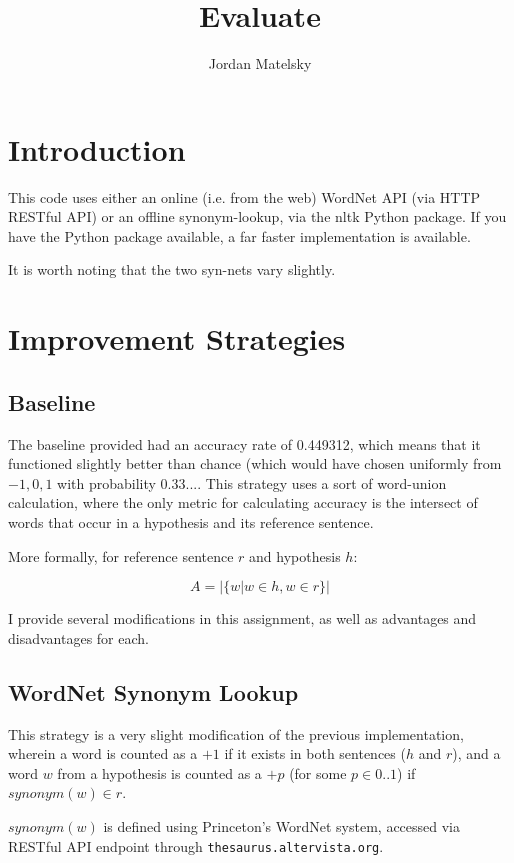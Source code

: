 \documentclass{article}
\title{Evaluate}
\author{Jordan Matelsky}
\begin{document}
\maketitle

\section{Introduction}
This code uses either an online (i.e. from the web) WordNet API (via HTTP RESTful API) or an offline synonym-lookup, via the nltk Python package. If you have the Python package available, a far faster implementation is available.

It is worth noting that the two syn-nets vary slightly.

\section{Improvement Strategies}

\subsection{Baseline}
The baseline provided had an accuracy rate of 0.449312, which means that it functioned slightly better than chance (which would have chosen uniformly from ${-1, 0, 1}$ with probability $0.33...$. This strategy uses a sort of word-union calculation, where the only metric for calculating accuracy is the intersect of words that occur in a hypothesis and its reference sentence.

More formally, for reference sentence $r$ and hypothesis $h$:

$$A = \big| \{ w | w \in h, w \in r \} \big|$$

I provide several modifications in this assignment, as well as advantages and disadvantages for each.

\subsection{WordNet Synonym Lookup}
This strategy is a very slight modification of the previous implementation, wherein a word is counted as a $+1$ if it exists in both sentences ($h$ and $r$), and a word $w$ from a hypothesis is counted as a $+p$ (for some $p \in 0..1$) if $synonym(w) \in r$.

$synonym(w)$ is defined using Princeton's WordNet system, accessed via RESTful API endpoint through \texttt{thesaurus.altervista.org}.
\end{document}
